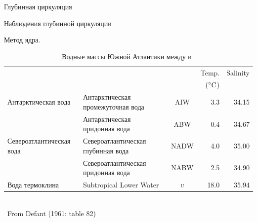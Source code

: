 \begin{chapter}{Глубинная циркуляция}
\begin{section}{Наблюдения глубинной циркуляции}
\begin{paragraph}{Метод ядра.}
\begin{table}[b!]
\caption{Водные массы Южной Атлантики между  и~}
\label{tbl:13.1}
\small %
\begin{tabular}{llc|r|r}
\hline
                        &                                                &       & Temp.        & Salinity  \\
                        &                                                  &       & (${}^\circ\mbox{C}$) &      \\
\hline
Антарктическая вода      & Антарктическая промежуточная вода  & AIW   & 3.3 & 34.15 \\
                         & Антарктическая придонная вода      & ABW   & 0.4 & 34.67 \\
Североатлантическая вода & Североатлантическая глубинная вода & NADW  & 4.0 & 35.00 \\
                         & Североатлантическая придонная вода & NABW  & 2.5 & 34.90 \\
Вода термоклина          & Subtropical Lower Water           & \textsc{u}     & 18.0         & 35.94     \\ [0.5ex]
\hline
\end{tabular} \\ [0.5ex]
\footnotesize{\ From Defant (1961: table 82)} \rule{0ex}{1.5ex} \hfill
\
\end{table}
%

\end{paragraph}
\end{section}
\end{chapter}
